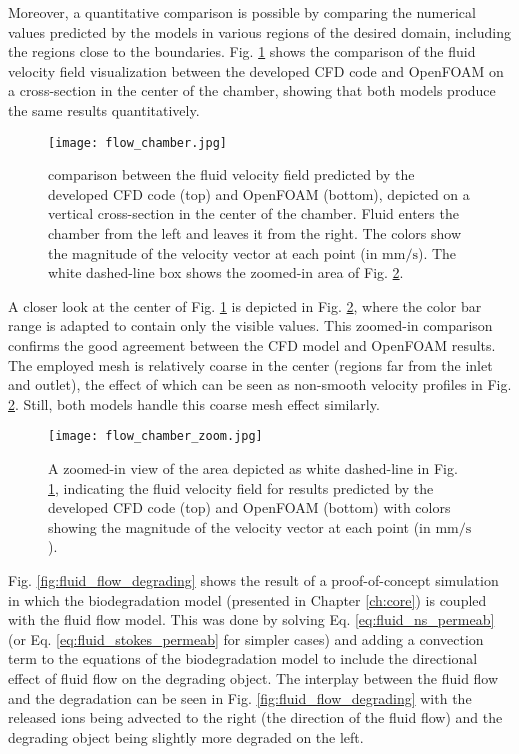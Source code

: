 Moreover, a quantitative comparison is possible by comparing the numerical values predicted by the models in various regions of the desired domain, including the regions close to the boundaries. Fig. \ref{fig:fluid_flow_chamber} shows the comparison of the fluid velocity field visualization between the developed \gls{CFD} code and OpenFOAM on a cross-section in the center of the chamber, showing that both models produce the same results quantitatively.

\begin{figure}[h]
\centering
\medskip
\texttt{[image: flow\_chamber.jpg]}
\caption[Comparing flow field results of developed CFD code and OpenFOAM]{comparison between the fluid velocity field predicted by the developed \gls{CFD} code (top) and OpenFOAM (bottom), depicted on a vertical cross-section in the center of the chamber. Fluid enters the chamber from the left and leaves it from the right. The colors show the magnitude of the velocity vector at each point (in $\mathrm{mm}/\mathrm{s}$). The white dashed-line box shows the zoomed-in area of Fig. \ref{fig:fluid_flow_chamber_zoom}.} \label{fig:fluid_flow_chamber}
\end{figure}

A closer look at the center of Fig. \ref{fig:fluid_flow_chamber} is depicted in Fig. \ref{fig:fluid_flow_chamber_zoom}, where the color bar range is adapted to contain only the visible values. This zoomed-in comparison confirms the good agreement between the \gls{CFD} model and OpenFOAM results. The employed mesh is relatively coarse in the center (regions far from the inlet and outlet), the effect of which can be seen as non-smooth velocity profiles in Fig. \ref{fig:fluid_flow_chamber_zoom}. Still, both models handle this coarse mesh effect similarly.

\begin{figure}[h]
\centering
\medskip
\texttt{[image: flow\_chamber\_zoom.jpg]}
\caption[Comparing flow field results of developed CFD code and OpenFOAM - zoomed-in view]{A zoomed-in view of the area depicted as white dashed-line in Fig. \ref{fig:fluid_flow_chamber}, indicating the fluid velocity field for results predicted by the developed \gls{CFD} code (top) and OpenFOAM (bottom) with colors showing the magnitude of the velocity vector at each point (in $\mathrm{mm}/\mathrm{s}$).} \label{fig:fluid_flow_chamber_zoom}
\end{figure}

Fig. \ref{fig:fluid_flow_degrading} shows the result of a proof-of-concept simulation in which the biodegradation model \cite{Barzegari2021} (presented in Chapter \ref{ch:core}) is coupled with the fluid flow model. This was done by solving Eq. \ref{eq:fluid_ns_permeab} (or Eq. \ref{eq:fluid_stokes_permeab} for simpler cases) and adding a convection term to the equations of the biodegradation model to include the directional effect of fluid flow on the degrading object. The interplay between the fluid flow and the degradation can be seen in Fig. \ref{fig:fluid_flow_degrading} with the released ions being advected to the right (the direction of the fluid flow) and the degrading object being slightly more degraded on the left.

